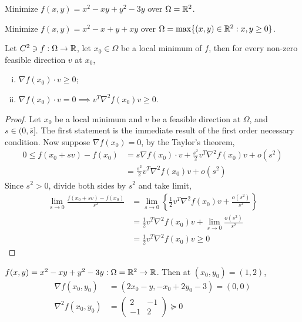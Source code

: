\documentclass{article}
\begin{document}
   	\begin{example}
   		Minimize $f(x, y)=x^{2}-x y+y^{2}-3 y$ over $\Omega = \mathbb{R}^2$.
   	\end{example}
   	
   	\begin{example}
   		Minimize $f(x, y)=x^{2}-x+y+x y$ over $\Omega = \max\{(x, y) \in \mathbb{R}^2: x, y \geq 0\}$.
   	\end{example}
   	
   	\begin{theorem}
   		Let $C^2 \ni f: \Omega \to \mathbb{R}$, let $x_0 \in \Omega$ be a local minimum of $f$, then for every non-zero feasible direction $v$ at $x_0$,
   		\begin{enumerate}[(i)]
   			\item $\nabla f(x_0) \cdot v \geq 0$;
   			\item $\nabla f(x_0) \cdot v = 0 \implies v^T \nabla^2 f(x_0) v \geq 0$.
   		\end{enumerate}
   	\end{theorem}
   	
   	\begin{proof}
   		Let $x_0$ be a local minimum and $v$ be a feasible direction at $\Omega$, and $s \in (0, \overline{s}]$. The first statement is the immediate result of the first order necessary condition. Now suppose $\nabla f(x_0) = 0$, by the Taylor's theorem,
   		\begin{align}
   			0 \leq f(x_0 + sv) - f(x_0) &= s \nabla f(x_0) \cdot v + \frac{s^2}{2} v^T \nabla^2 f(x_0) v + o(s^2) \\
   			&=\frac{s^2}{2} v^T \nabla^2 f(x_0) v + o(s^2)
   		\end{align}
   		Since $s^2 > 0$, divide both sides by $s^2$ and take limit,
   		\begin{align}
   			\lim_{s \to 0} \frac{f(x_0 + sv) - f(x_0)}{s^2} &= \lim_{s \to 0} 
   			\left \{\frac{1}{2} v^T \nabla^2 f(x_0) v + \frac{o(s^2)}{s^2} \right\}\\
   			&= \frac{1}{2} v^T \nabla^2 f(x_0) v + \lim_{s \to 0} \frac{o(s^2)}{s^2} \\
   			&= \frac{1}{2} v^T \nabla^2 f(x_0) v \geq 0
   		\end{align}
   	\end{proof}
   	
	\begin{example}
		$f(x, y) = x^2 - xy + y^2 - 3y: \Omega = \mathbb{R}^2 \to \mathbb{R}$. Then at $(x_0, y_0) = (1, 2)$, 
		\begin{align}
			\nabla f(x_0, y_0) &= (2x_0 - y, -x_0 + 2y_0 - 3) = (0, 0) \\
			\nabla^2 f(x_0, y_0) &= 
			\begin{pmatrix}
				2 & -1 \\ -1 & 2
			\end{pmatrix} \succcurlyeq 0 
		\end{align}
	\end{example}
	
\end{document}
